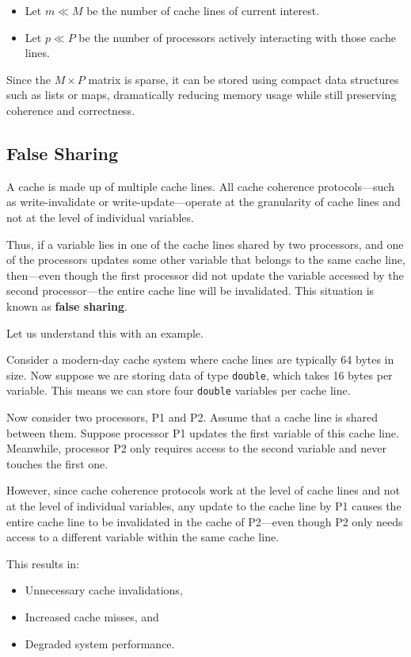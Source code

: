 \documentclass[12pt]{book}
\begin{document}
\begin{itemize}
    \item Let $m \ll M$ be the number of cache lines of current interest.
    \item Let $p \ll P$ be the number of processors actively interacting with those cache lines.
\end{itemize}

Since the $M \times P$ matrix is sparse, it can be stored using compact data structures such as lists or maps, dramatically reducing memory usage while still preserving coherence and correctness.

\subsection{False Sharing}

A cache is made up of multiple cache lines. All cache coherence protocols—such as write-invalidate or write-update—operate at the granularity of cache lines and not at the level of individual variables. 

Thus, if a variable lies in one of the cache lines shared by two processors, and one of the processors updates some other variable that belongs to the same cache line, then—even though the first processor did not update the variable accessed by the second processor—the entire cache line will be invalidated. This situation is known as \textbf{false sharing}.

Let us understand this with an example.

Consider a modern-day cache system where cache lines are typically 64 bytes in size. Now suppose we are storing data of type \texttt{double}, which takes 16 bytes per variable. This means we can store four \texttt{double} variables per cache line.

Now consider two processors, P1 and P2. Assume that a cache line is shared between them. Suppose processor P1 updates the first variable of this cache line. Meanwhile, processor P2 only requires access to the second variable and never touches the first one.

However, since cache coherence protocols work at the level of cache lines and not at the level of individual variables, any update to the cache line by P1 causes the entire cache line to be invalidated in the cache of P2—even though P2 only needs access to a different variable within the same cache line.

This results in:
\begin{itemize}
    \item Unnecessary cache invalidations,
    \item Increased cache misses, and
    \item Degraded system performance.
\end{itemize}
\end{document}
